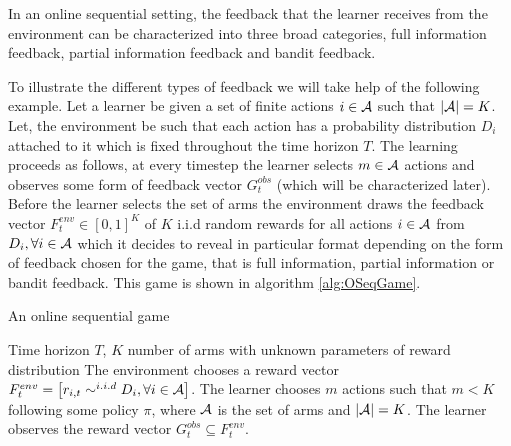 In an online sequential setting, the feedback that the learner receives from the environment can be characterized into three broad categories, full information feedback, partial information feedback and bandit feedback. 


    To illustrate the different types of feedback we will take help of the following example. Let a learner be given a set of finite actions $i\in\mathcal{A}$ such that $|\mathcal{A}|=K$. Let, the environment be such that each action has a probability distribution $D_i$ attached to it which is fixed throughout the time horizon $T$. The learning proceeds as follows, at every timestep the learner selects $m\in\mathcal{A}$ actions and observes some form of feedback vector $G^{obs}_{t}$ (which will be characterized later). Before the learner selects the set of arms the environment draws the feedback vector $F^{env}_t\in[0,1]^{K}$ of $K$ i.i.d random rewards for all actions $i\in\mathcal{A}$ from $D_i,\forall i\in\mathcal{A}$ which it decides to reveal in particular format depending on the form of feedback chosen for the game, that is full information, partial information or bandit feedback. This game is shown in algorithm \ref{alg:OSeqGame}. 

\begin{algorithm}[!th]
\caption{An online sequential game}
\label{alg:OSeqGame}
\begin{algorithmic}
 Time horizon $T$, $K$ number of arms with unknown parameters of reward distribution
\State {}
\State The environment chooses a reward vector $F^{env}_{t}= \left[r_{i,t}\sim^{i.i.d} D_{i},\forall i\in\mathcal{A}\right]$.
\State The learner chooses $m$ actions such that $m < K$ following some policy $\pi$, where $\mathcal{A}$ is the set of arms and $|\mathcal{A}|=K$.
\State The learner observes the reward vector $G^{obs}_{t}\subseteq F^{env}_{t}$.
\State \EndFor
\end{algorithmic}
\end{algorithm}



